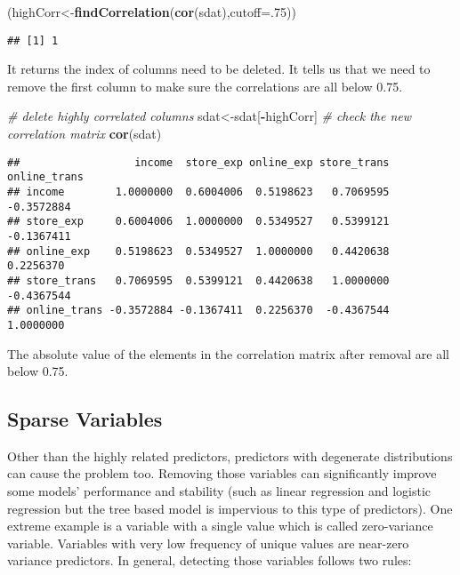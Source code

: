 \documentclass[
]{article}
\newenvironment{Shaded}{\begin{snugshade}}{\end{snugshade}}
\newcommand{\CommentTok}[1]{\textcolor[rgb]{0.56,0.35,0.01}{\textit{#1}}}
\newcommand{\DataTypeTok}[1]{\textcolor[rgb]{0.13,0.29,0.53}{#1}}
\newcommand{\DecValTok}[1]{\textcolor[rgb]{0.00,0.00,0.81}{#1}}
\newcommand{\KeywordTok}[1]{\textcolor[rgb]{0.13,0.29,0.53}{\textbf{#1}}}
\newcommand{\NormalTok}[1]{#1}
\newcommand{\OperatorTok}[1]{\textcolor[rgb]{0.81,0.36,0.00}{\textbf{#1}}}
\begin{document}
\begin{Shaded}
\begin{Highlighting}[]
\NormalTok{(highCorr<-}\KeywordTok{findCorrelation}\NormalTok{(}\KeywordTok{cor}\NormalTok{(sdat),}\DataTypeTok{cutoff=}\NormalTok{.}\DecValTok{75}\NormalTok{))}
\end{Highlighting}
\end{Shaded}

\begin{verbatim}
## [1] 1
\end{verbatim}

It returns the index of columns need to be deleted. It tells us that we
need to remove the first column to make sure the correlations are all
below 0.75.

\begin{Shaded}
\begin{Highlighting}[]
\CommentTok{# delete highly correlated columns}
\NormalTok{sdat<-sdat[}\OperatorTok{-}\NormalTok{highCorr]}
\CommentTok{# check the new correlation matrix}
\KeywordTok{cor}\NormalTok{(sdat)}
\end{Highlighting}
\end{Shaded}

\begin{verbatim}
##                  income  store_exp online_exp store_trans online_trans
## income        1.0000000  0.6004006  0.5198623   0.7069595   -0.3572884
## store_exp     0.6004006  1.0000000  0.5349527   0.5399121   -0.1367411
## online_exp    0.5198623  0.5349527  1.0000000   0.4420638    0.2256370
## store_trans   0.7069595  0.5399121  0.4420638   1.0000000   -0.4367544
## online_trans -0.3572884 -0.1367411  0.2256370  -0.4367544    1.0000000
\end{verbatim}

The absolute value of the elements in the correlation matrix after
removal are all below 0.75.

\hypertarget{sparse-variables}{%
\subsection{Sparse Variables}\label{sparse-variables}}

Other than the highly related predictors, predictors with degenerate
distributions can cause the problem too. Removing those variables can
significantly improve some models' performance and stability (such as
linear regression and logistic regression but the tree based model is
impervious to this type of predictors). One extreme example is a
variable with a single value which is called zero-variance variable.
Variables with very low frequency of unique values are near-zero
variance predictors. In general, detecting those variables follows two
rules:
\end{document}
